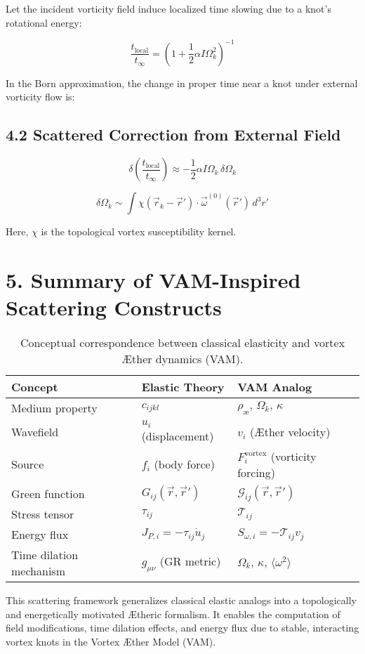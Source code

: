 Let the incident vorticity field induce localized time slowing due to a knot’s rotational energy:

\[
\frac{t_{\text{local}}}{t_{\infty}} = \left(1 + \frac{1}{2} \alpha I \Omega_k^2 \right)^{-1}
\]

In the Born approximation, the change in proper time near a knot under external vorticity flow is:

\subsection*{4.2 Scattered Correction from External Field}

\[
\delta \left( \frac{t_{\text{local}}}{t_{\infty}} \right) \approx - \frac{1}{2} \alpha I \Omega_k \, \delta \Omega_k
\]

\[
\delta \Omega_k \sim \int \chi(\vec{r}_k - \vec{r}') \cdot \vec{\omega}^{(0)}(\vec{r}') \, d^3r'
\]

Here, \(\chi\) is the topological vortex susceptibility kernel.



\section*{5. Summary of VAM-Inspired Scattering Constructs}


\begin{table}[h!]
    \centering
    \begin{tabular}{lll}
        \toprule
        \textbf{Concept} & \textbf{Elastic Theory} & \textbf{VAM Analog} \\
        \midrule
        Medium property & \( c_{ijkl} \) & \( \rho_{\text{\ae}},\, \Omega_k,\, \kappa \) \\
        Wavefield & \( u_i \) (displacement) & \( v_i \) (Æther velocity) \\
        Source & \( f_i \) (body force) & \( F_i^{\text{vortex}} \) (vorticity forcing) \\
        Green function & \( G_{ij}(\vec{r}, \vec{r}') \) & \( \mathcal{G}_{ij}(\vec{r}, \vec{r}') \) \\
        Stress tensor & \( \tau_{ij} \) & \( \mathcal{T}_{ij} \) \\
        Energy flux & \( J_{P,i} = -\tau_{ij} \dot{u}_j \) & \( S_{\omega,i} = -\mathcal{T}_{ij} v_j \) \\
        Time dilation mechanism & \( g_{\mu\nu} \) (GR metric) & \( \Omega_k,\, \kappa,\, \langle \omega^2 \rangle \) \\
        \bottomrule
    \end{tabular}
    \caption{Conceptual correspondence between classical elasticity and vortex Æther dynamics (VAM).}
    \label{tab:elastic-vam-analogy}
\end{table}



This scattering framework generalizes classical elastic analogs into a topologically and energetically motivated Ætheric formalism. It enables the computation of field modifications, time dilation effects, and energy flux due to stable, interacting vortex knots in the Vortex Æther Model (VAM).